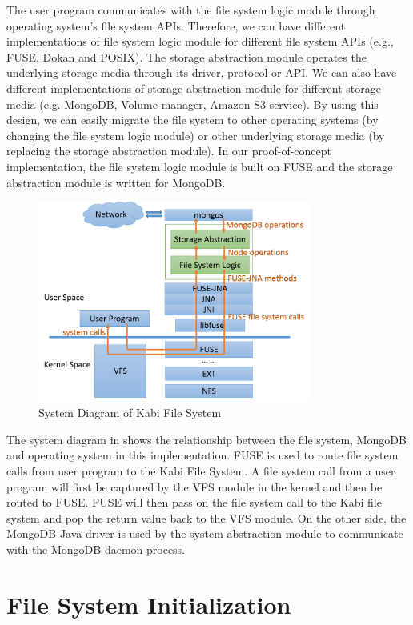     The user program communicates with the file system logic module through operating system's file system APIs. Therefore, we can have different implementations of file system logic module for different file system APIs (e.g., FUSE, Dokan and POSIX). The storage abstraction module operates the underlying storage media through its driver, protocol or API. We can also have different implementations of storage abstraction module for different storage media (e.g. MongoDB, Volume manager, Amazon S3 service). By using this design, we can easily migrate the file system to other operating systems (by changing the file system logic module) or other underlying storage media (by replacing the storage abstraction module). In our proof-of-concept implementation, the file system logic module is built on FUSE and the storage abstraction module is written for MongoDB. 

\begin{figure}[t]
\centering
\includegraphics[width=0.8\textwidth]{Chapter-3/figs/fig1.png}
\caption{System Diagram of Kabi File System}
\label{fig:diagram}
\end{figure}

    The system diagram in  shows the relationship between the file system, MongoDB and operating system in this implementation. FUSE is used to route file system calls from user program to the Kabi File System. A file system call from a user program will first be captured by the VFS module in the kernel and then be routed to FUSE. FUSE will then pass on the file system call to the Kabi file system and pop the return value back to the VFS module. On the other side, the MongoDB Java driver is used by the system abstraction module to communicate with the MongoDB daemon process.

\section{File System Initialization}

